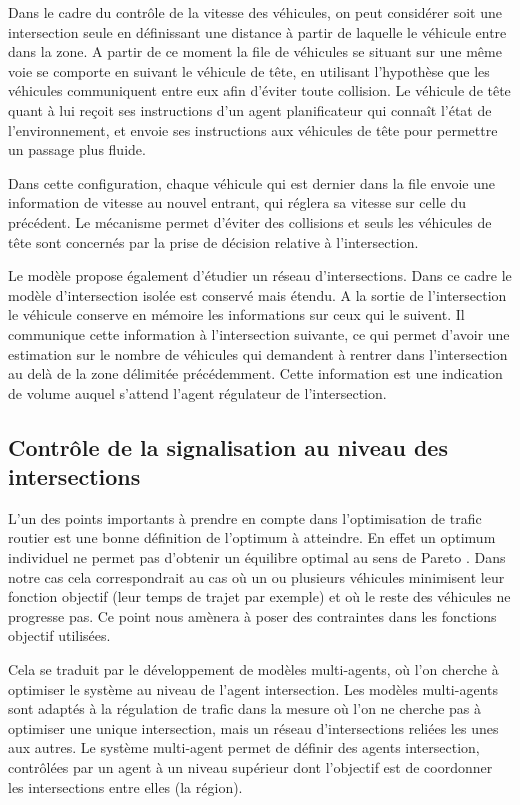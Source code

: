 \documentclass[11pt]{article}
\begin{document}
Dans le cadre du contrôle de la vitesse des véhicules, on peut considérer soit une intersection seule en définissant une distance à partir de laquelle le véhicule entre dans la zone. A partir de ce moment la file de véhicules se situant sur une même voie se comporte en suivant le véhicule de tête, en utilisant l'hypothèse que les véhicules communiquent entre eux afin d'éviter toute collision. Le véhicule de tête quant à lui reçoit ses instructions d'un agent planificateur qui connaît l'état de l'environnement, et envoie ses instructions aux véhicules de tête pour permettre un passage plus fluide.

Dans cette configuration, chaque véhicule qui est dernier dans la file envoie une information de vitesse au nouvel entrant, qui réglera sa vitesse sur celle du précédent. Le mécanisme permet d'éviter des collisions et seuls les véhicules de tête sont concernés par la prise de décision relative à l'intersection.

Le modèle propose également d'étudier un réseau d'intersections. Dans ce cadre le modèle d'intersection isolée est conservé mais étendu. A la sortie de l'intersection le véhicule conserve en mémoire les informations sur ceux qui le suivent. Il communique cette information à l'intersection suivante, ce qui permet d'avoir une estimation sur le nombre de véhicules qui demandent à rentrer dans l'intersection au delà de la zone délimitée précédemment. Cette information est une indication de volume auquel s'attend l'agent régulateur de l'intersection.

\subsection{Contrôle de la signalisation au niveau des intersections}
\label{sec:orgad25bb9}

L'un des points importants à prendre en compte dans l'optimisation de trafic routier est une bonne définition de l'optimum à atteindre. En effet un optimum individuel ne permet pas d'obtenir un équilibre optimal au sens de Pareto \cite{lujak2014fair}. Dans notre cas cela correspondrait au cas où un ou plusieurs véhicules minimisent leur fonction objectif (leur temps de trajet par exemple) et où le reste des véhicules ne progresse pas. Ce point nous amènera à poser des contraintes dans les fonctions objectif utilisées. 

Cela se traduit par le développement de modèles multi-agents, où l'on cherche à optimiser le système au niveau de l'agent intersection. Les modèles multi-agents sont adaptés à la régulation de trafic dans la mesure où l'on ne cherche pas à optimiser une unique intersection, mais un réseau d'intersections reliées les unes aux autres. Le système multi-agent permet de définir des agents intersection, contrôlées par un agent à un niveau supérieur dont l'objectif est de coordonner les intersections entre elles (la région). 
\end{document}
